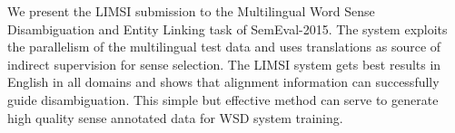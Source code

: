 We present the LIMSI submission to the Multilingual Word Sense Disambiguation and Entity Linking task of SemEval-2015. The system exploits the parallelism of the multilingual test data and uses translations as source of indirect supervision for sense selection. The LIMSI system gets best results in English in all domains and shows that alignment information can successfully guide disambiguation. This simple but effective method can serve to generate high quality sense annotated data for WSD system training.
